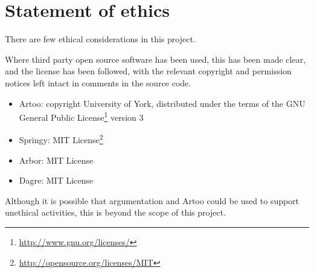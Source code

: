 \section{Statement of ethics}

There are few ethical considerations in this project.

Where third party open source software has been used, this has been made clear, and the license has been followed, with the relevant copyright and permission notices left intact in comments in the source code.

\begin{itemize}
\item Artoo: copyright  University of York, distributed under the terms of the GNU General Public License\footnote{\url{http://www.gnu.org/licenses/}} version 3
\item Springy: MIT License\footnote{\url{http://opensource.org/licenses/MIT}}
\item Arbor: MIT License
\item Dagre: MIT License
\end{itemize}

Although it is possible that argumentation and Artoo could be used to support unethical activities, this is beyond the scope of this project.
